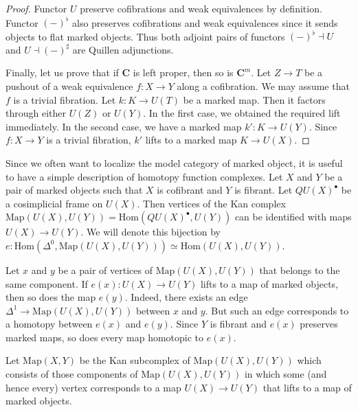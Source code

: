 \documentclass[reqno]{amsart}
\theoremstyle{definition}
\theoremstyle{remark}
\newcommand{\cat}[1]{\mathbf{#1}}
\newcommand{\C}{\cat{C}}
\newcommand{\Hom}{\mathrm{Hom}}
\newcommand{\Map}{\mathrm{Map}}
\numberwithin{figure}{section}
\begin{document}
\begin{proof}
Functor $U$ preserve cofibrations and weak equivalences by definition.
Functor $(-)^\flat$ also preserves cofibrations and weak equivalences since it sends objects to flat marked objects.
Thus both adjoint pairs of functors $(-)^\flat \dashv U$ and $U \dashv (-)^\sharp$ are Quillen adjunctions.

Finally, let us prove that if $\C$ is left proper, then so is $\C^m$.
Let $Z \to T$ be a pushout of a weak equivalence $f : X \to Y$ along a cofibration.
We may assume that $f$ is a trivial fibration.
Let $k : K \to U(T)$ be a marked map.
Then it factors through either $U(Z)$ or $U(Y)$.
In the first case, we obtained the required lift immediately.
In the second case, we have a marked map $k' : K \to U(Y)$.
Since $f : X \to Y$ is a trivial fibration, $k'$ lifts to a marked map $K \to U(X)$.
\end{proof}

Since we often want to localize the model category of marked object, it is useful to have a simple description of homotopy function complexes.
Let $X$ and $Y$ be a pair of marked objects such that $X$ is cofibrant and $Y$ is fibrant.
Let $QU(X)^\bullet$ be a cosimplicial frame on $U(X)$.
Then vertices of the Kan complex $\Map(U(X),U(Y)) = \Hom(QU(X)^\bullet,U(Y))$ can be identified with maps $U(X) \to U(Y)$.
We will denote this bijection by $e : \Hom(\Delta^0,\Map(U(X),U(Y))) \simeq \Hom(U(X),U(Y))$.

Let $x$ and $y$ be a pair of vertices of $\Map(U(X),U(Y))$ that belongs to the same component.
If $e(x) : U(X) \to U(Y)$ lifts to a map of marked objects, then so does the map $e(y)$.
Indeed, there exists an edge $\Delta^1 \to \Map(U(X),U(Y))$ between $x$ and $y$.
But such an edge corresponds to a homotopy between $e(x)$ and $e(y)$.
Since $Y$ is fibrant and $e(x)$ preserves marked maps, so does every map homotopic to $e(x)$.

Let $\Map(X,Y)$ be the Kan subcomplex of $\Map(U(X),U(Y))$ which consists of those components of
$\Map(U(X),U(Y))$ in which some (and hence every) vertex corresponds to a map $U(X) \to U(Y)$ that lifts to a map of marked objects.
\end{document}
